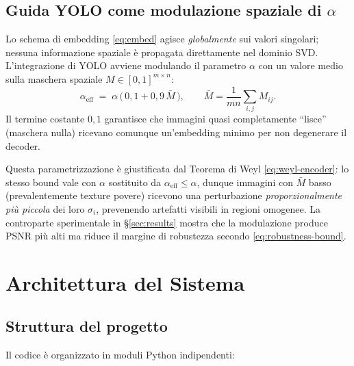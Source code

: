 \documentclass[11pt,a4paper]{article}
\theoremstyle{definition}
\theoremstyle{remark}
\begin{document}
\subsection{Guida YOLO come modulazione spaziale di \texorpdfstring{$\alpha$}{alpha}}
\label{sec:yolo-math}

Lo schema di embedding \eqref{eq:embed} agisce \emph{globalmente} sui
valori singolari; nessuna informazione spaziale è propagata
direttamente nel dominio SVD.  L'integrazione di YOLO avviene
modulando il parametro $\alpha$ con un valore medio sulla maschera
spaziale $M\in[0,1]^{m\times n}$:
\begin{equation}\label{eq:alpha-eff}
   \alpha_{\text{eff}}
   \;=\; \alpha \,\bigl(\,0{,}1 + 0{,}9 \,\bar M\,\bigr),
   \qquad
   \bar M = \frac{1}{m n}\sum_{i,j} M_{ij}.
\end{equation}
Il termine costante $0{,}1$ garantisce che immagini quasi completamente
``lisce'' (maschera nulla) ricevano comunque un'embedding minimo per
non degenerare il decoder.

\noindent
Questa parametrizzazione è giustificata dal Teorema di Weyl
\eqref{eq:weyl-encoder}: lo stesso bound vale con $\alpha$ sostituito da
$\alpha_{\text{eff}}\leq\alpha$, dunque immagini con $\bar M$ basso
(prevalentemente texture povere) ricevono una perturbazione
\emph{proporzionalmente più piccola} dei loro $\sigma_i$, prevenendo
artefatti visibili in regioni omogenee.  La controparte sperimentale
in \S\ref{sec:results} mostra che la modulazione produce PSNR più alti
ma riduce il margine di robustezza secondo \eqref{eq:robustness-bound}.


\section{Architettura del Sistema}

\subsection{Struttura del progetto}

Il codice è organizzato in moduli Python indipendenti:
\end{document}
